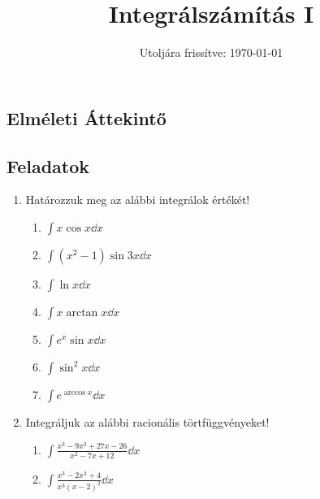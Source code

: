 \documentclass[a4paper, 12pt]{scrartcl}
\title{Integrálszámítás I}
\date{Utoljára frissítve: \today}
\begin{document}
\maketitle

\subsection{Elméleti Áttekintő}

\clearpage
\subsection{Feladatok}

\begin{enumerate}
  \item Határozzuk meg az alábbi integrálok értékét!
        \begin{enumerate}
          \item $\displaystyle
                  \int x \cos x \dd x
                $

          \item $\displaystyle
                  \int (x^2 - 1) \sin 3x \dd x
                $

          \item $\displaystyle
                  \int \ln x \dd x
                $

          \item $\displaystyle
                  \int x \arctan x \dd x
                $

          \item $\displaystyle
                  \int e^x \sin x \dd x
                $

          \item $\displaystyle
                  \int \sin^2 x \dd x
                $

          \item $\displaystyle
                  \int e^{\arccos x} \dd x
                $
        \end{enumerate}

  \item Integráljuk az alábbi racionális törtfüggvényeket!
        \begin{enumerate}
          \item $\displaystyle
                  \int \frac{x^3 - 9x^2 + 27x - 26}{x^2 - 7x + 12} \dd x
                $

          \item $\displaystyle
                  \int \frac{x^3 - 2x^2 + 4}{x^3 (x - 2)^2} \dd x
                $


\end{enumerate}
\end{enumerate}
\end{document}
